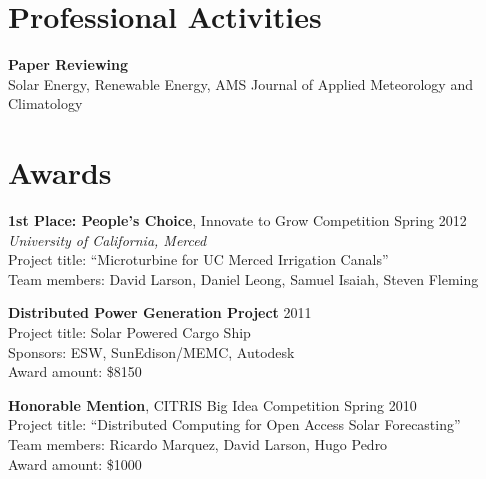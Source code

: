 \documentclass[]{res}
\begin{document}
\begin{resume}
\section{Professional Activities}
\vspace{0.1in}

\textbf{Paper Reviewing} \\
Solar Energy, Renewable Energy, AMS Journal of Applied Meteorology and
Climatology


%
\section{Awards}
\vspace{0.1in}

\textbf{1st Place: People's Choice}, Innovate to Grow Competition \hfill Spring 2012 \\
\textit{University of California, Merced} \\
Project title: ``Microturbine for UC Merced Irrigation Canals'' \\
Team members: David Larson, Daniel Leong, Samuel Isaiah, Steven Fleming

\textbf{Distributed Power Generation Project} \hfill 2011 \\
Project title: Solar Powered Cargo Ship \\
Sponsors: ESW, SunEdison/MEMC, Autodesk \\
Award amount: \$8150

\textbf{Honorable Mention}, CITRIS Big Idea Competition \hfill Spring 2010 \\
Project title: ``Distributed Computing for Open Access Solar Forecasting'' \\
Team members: Ricardo Marquez, David Larson, Hugo Pedro \\
Award amount: \$1000




\end{resume}
\end{document}
